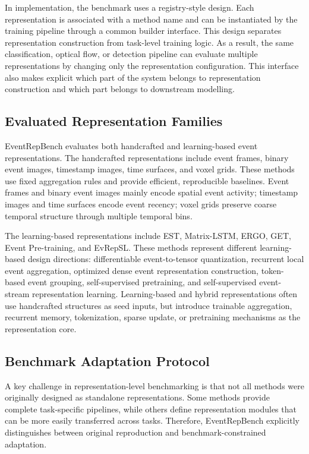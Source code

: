 \documentclass[letterpaper]{article}
\begin{document}
In implementation, the benchmark uses a registry-style design. Each representation is associated with a method name and can be instantiated by the training pipeline through a common builder interface. This design separates representation construction from task-level training logic. As a result, the same classification, optical flow, or detection pipeline can evaluate multiple representations by changing only the representation configuration. This interface also makes explicit which part of the system belongs to representation construction and which part belongs to downstream modelling.

\subsection{Evaluated Representation Families}
EventRepBench evaluates both handcrafted and learning-based event representations. The handcrafted representations include event frames, binary event images, timestamp images, time surfaces, and voxel grids. These methods use fixed aggregation rules and provide efficient, reproducible baselines. Event frames and binary event images mainly encode spatial event activity; timestamp images and time surfaces encode event recency; voxel grids preserve coarse temporal structure through multiple temporal bins.

The learning-based representations include EST, Matrix-LSTM, ERGO, GET, Event Pre-training, and EvRepSL. These methods represent different learning-based design directions: differentiable event-to-tensor quantization, recurrent local event aggregation, optimized dense event representation construction, token-based event grouping, self-supervised pretraining, and self-supervised event-stream representation learning. Learning-based and hybrid representations often use handcrafted structures as seed inputs, but introduce trainable aggregation, recurrent memory, tokenization, sparse update, or pretraining mechanisms as the representation core.

\subsection{Benchmark Adaptation Protocol}
A key challenge in representation-level benchmarking is that not all methods were originally designed as standalone representations. Some methods provide complete task-specific pipelines, while others define representation modules that can be more easily transferred across tasks. Therefore, EventRepBench explicitly distinguishes between original reproduction and benchmark-constrained adaptation.
\end{document}
